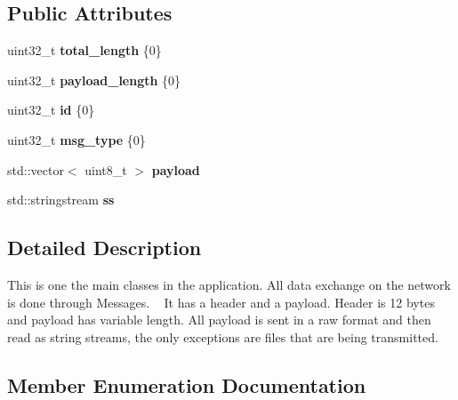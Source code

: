 \subsection*{Public Attributes}
\begin{DoxyCompactItemize}
\item 
uint32\+\_\+t {\bfseries total\+\_\+length} \{0\}\hypertarget{structMessage_a956485001345f455ac9ff675c9ec33ff}{}\label{structMessage_a956485001345f455ac9ff675c9ec33ff}

\item 
uint32\+\_\+t {\bfseries payload\+\_\+length} \{0\}\hypertarget{structMessage_a7540c3196a9649f76747a2e559ec34ac}{}\label{structMessage_a7540c3196a9649f76747a2e559ec34ac}

\item 
uint32\+\_\+t {\bfseries id} \{0\}\hypertarget{structMessage_a4c34674ebe8e9ac6a62a5b7c9c3e4123}{}\label{structMessage_a4c34674ebe8e9ac6a62a5b7c9c3e4123}

\item 
uint32\+\_\+t {\bfseries msg\+\_\+type} \{0\}\hypertarget{structMessage_a127a7296f3fe3ca2379b52d4d578d128}{}\label{structMessage_a127a7296f3fe3ca2379b52d4d578d128}

\item 
std\+::vector$<$ uint8\+\_\+t $>$ {\bfseries payload}\hypertarget{structMessage_ae178876b7de2f7d7629663350d20c599}{}\label{structMessage_ae178876b7de2f7d7629663350d20c599}

\item 
std\+::stringstream {\bfseries ss}\hypertarget{structMessage_ac499b4fb6c41a7512584c3cff3c68469}{}\label{structMessage_ac499b4fb6c41a7512584c3cff3c68469}

\end{DoxyCompactItemize}


\subsection{Detailed Description}
This is one the main classes in the application. All data exchange on the network is done through Messages. ~\newline
It has a header and a payload. Header is 12 bytes and payload has variable length. All payload is sent in a raw format and then read as string streams, the only exceptions are files that are being transmitted. 

\subsection{Member Enumeration Documentation}
